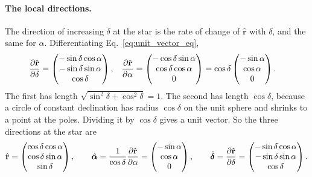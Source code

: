 \paragraph{The local directions.} The direction of increasing $\delta$ at the star is the rate of change of $\hat{\mathbf r}$ with $\delta$, and the same for $\alpha$. Differentiating Eq.~\eqref{eq:unit_vector_eq},
\begin{align}
	\pdv{\hat{\mathbf r}}{\delta} &= \begin{pmatrix} -\sin\delta\cos\alpha \\ -\sin\delta\sin\alpha \\ \cos\delta \end{pmatrix},
	&
	\pdv{\hat{\mathbf r}}{\alpha} &= \begin{pmatrix} -\cos\delta\sin\alpha \\ \cos\delta\cos\alpha \\ 0 \end{pmatrix} = \cos\delta\begin{pmatrix} -\sin\alpha \\ \cos\alpha \\ 0 \end{pmatrix}.
	\label{as:eq:partials}
\end{align}
The first has length $\sqrt{\sin^2\delta+\cos^2\delta}=1$. The second has length $\cos\delta$, because a circle of constant declination has radius $\cos\delta$ on the unit sphere and shrinks to a point at the poles. Dividing it by $\cos\delta$ gives a unit vector. So the three directions at the star are
\begin{equation}
	\hat{\mathbf r} = \begin{pmatrix} \cos\delta\cos\alpha \\ \cos\delta\sin\alpha \\ \sin\delta \end{pmatrix}, \qquad
	\hat{\boldsymbol{\alpha}} = \frac{1}{\cos\delta}\pdv{\hat{\mathbf r}}{\alpha} = \begin{pmatrix} -\sin\alpha \\ \cos\alpha \\ 0 \end{pmatrix}, \qquad
	\hat{\boldsymbol{\delta}} = \pdv{\hat{\mathbf r}}{\delta} = \begin{pmatrix} -\sin\delta\cos\alpha \\ -\sin\delta\sin\alpha \\ \cos\delta \end{pmatrix}.
	\label{eq:equatorial_basis_vectors}
\end{equation}
